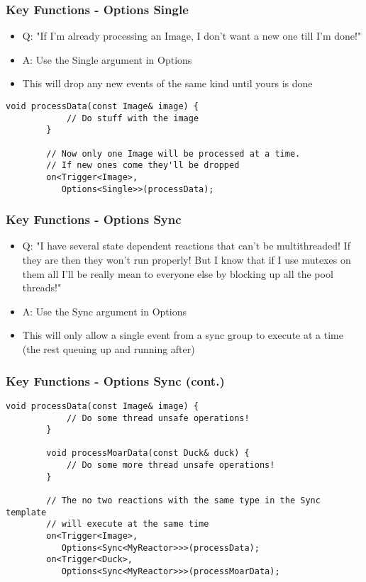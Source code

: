 \documentclass{beamer}
\begin{document}
\begin{frame}[fragile]
	\frametitle {Key Functions - Options Single}
	\begin{itemize}
		\item Q: "If I'm already processing an Image, I don't want a new one till I'm done!"
		\item A: Use the Single argument in Options
		\item This will drop any new events of the same kind until yours is done
	\end{itemize}

	\begin{lstlisting}[language=nuclear]
		void processData(const Image& image) {
		    // Do stuff with the image
		}

		// Now only one Image will be processed at a time.
		// If new ones come they'll be dropped
		on<Trigger<Image>, 
		   Options<Single>>(processData);
	\end{lstlisting}
\end{frame}

\begin{frame}[fragile]
	\frametitle {Key Functions - Options Sync}
	\begin{itemize}
		\item Q: "I have several state dependent reactions that can't be multithreaded! If they are then they won't run properly! But I know that if I use mutexes on them all I'll be really mean to everyone else by blocking up all the pool threads!"
		\item A: Use the Sync argument in Options
		\item This will only allow a single event from a sync group to execute at a time (the rest queuing up and running after)
	\end{itemize}
\end{frame}

\begin{frame}[fragile]
	\frametitle {Key Functions - Options Sync (cont.)}
	\begin{lstlisting}[language=nuclear]
		void processData(const Image& image) {
		    // Do some thread unsafe operations!
		}
		
		void processMoarData(const Duck& duck) {
		    // Do some more thread unsafe operations!
		}

		// The no two reactions with the same type in the Sync template
		// will execute at the same time
		on<Trigger<Image>, 
		   Options<Sync<MyReactor>>>(processData);
		on<Trigger<Duck>, 
		   Options<Sync<MyReactor>>>(processMoarData);
	\end{lstlisting}
\end{frame}
\end{document}
